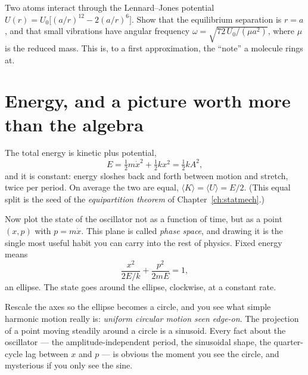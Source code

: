 \begin{exercise}
Two atoms interact through the Lennard--Jones potential $U(r)=U_{0}\big[(a/r)^{12}-2(a/r)^{6}\big]$. Show that the equilibrium separation is $r=a$, and that small vibrations have angular frequency $\omega=\sqrt{72\,U_{0}/(\mu a^{2})}$, where $\mu$ is the reduced mass. This is, to a first approximation, the ``note'' a molecule rings at.
\end{exercise}

\section{Energy, and a picture worth more than the algebra}

The total energy is kinetic plus potential,
\[
  E=\tfrac12 m\dot{x}^{2}+\tfrac12 kx^{2} = \tfrac12 kA^2,
\]
and it is constant: energy sloshes back and forth between motion and stretch, twice per period. On average the two are equal, $\langle K\rangle = \langle U\rangle = E/2$. (This equal split is the seed of the \emph{equipartition theorem} of Chapter~\ref{ch:statmech}.)

Now plot the state of the oscillator not as a function of time, but as a point $(x,p)$ with $p=m\dot{x}$. This plane is called \emph{phase space}, and drawing it is the single most useful habit you can carry into the rest of physics. Fixed energy means
\[
  \frac{x^2}{2E/k} + \frac{p^2}{2mE} = 1,
\]
an ellipse. The state goes around the ellipse, clockwise, at a constant rate.

\begin{center}
\end{center}

Rescale the axes so the ellipse becomes a circle, and you see what simple harmonic motion really is: \emph{uniform circular motion seen edge-on}. The projection of a point moving steadily around a circle is a sinusoid. Every fact about the oscillator --- the amplitude-independent period, the sinusoidal shape, the quarter-cycle lag between $x$ and $p$ --- is obvious the moment you see the circle, and mysterious if you only see the sine.

